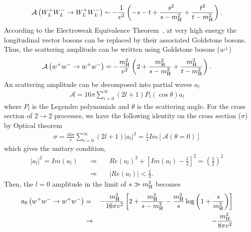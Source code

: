 \begin{eqnarray} 
\label{eq:WWscat}
\mathcal{A}\left( W_L^+W_L^- \to W_L^+W_L^- \right) 
\sim 
- \frac{1}{v^2}  \left( -s - t + \frac{s^2}{s - m_{\mathrm{H}}^2} + \frac{t^2}{t - m_{\mathrm{H}}^2} \right). 
\end{eqnarray} 
According to the Electroweak Equivalence Theorem~\cite{He:1994br},  
at very high energy the longitudinal vector bosons can be replaced by 
their associated Goldstone bosons. Thus, the scattering amplitude can be written 
using Goldstone bosons ($w^\pm$)
\begin{eqnarray} 
\mathcal{A}\left( w^+w^- \to w^+w^- \right) 
= 
- \frac{m_{\mathrm{H}}^2}{v^2}  \left( 2 + \frac{m_{\mathrm{H}}^2}{s - m_{\mathrm{H}}^2} + \frac{m_{\mathrm{H}}^2}{t - m_{\mathrm{H}}^2} \right). 
\end{eqnarray} 
An scattering amplitude can be decomposed into partial waves $a_l$
\begin{eqnarray} 
\mathcal{A} = 16 \pi \sum_{i=0}^\infty 
              \left( 2l+1 \right) P_l \left( \cos \theta \right) a_l
\end{eqnarray} 
where $P_l$ is the Legendre polynomials and $\theta$ is the scattering angle.
For the cross section of $2 \to 2$ processes, we have the 
following identity on the cross section ($\sigma$) by Optical theorem \cite{optical}
\begin{eqnarray} 
\sigma 
= \frac{16 \pi}{s} \sum_{i=0}^\infty  \left( 2l+1 \right) \left| a_l \right|^2 
= \frac{1}{s} Im \left[ \mathcal{A} \left(\theta = 0 \right)  \right]
\end{eqnarray} 
which gives the unitary condition, 
\begin{eqnarray} 
\left| a_l \right|^2 = Im \left( a_l \right) 
\quad &\Rightarrow& \quad  
Re\left( a_l \right)^2 
+ \left[ Im\left( a_l \right)  - \frac{1}{2} \right]^2 
= \left( \frac{1}{2} \right)^2 \\
\label{eq:unitaryWW}
\quad &\Rightarrow& \quad 
\left| Re \left( a_l \right) \right| < \frac{1}{2}.   
\end{eqnarray} 
Then, the $l=0$ amplitude in the limit of $ s \gg m_{\mathrm{H}}^2$ becomes  
\begin{eqnarray} 
a_0\left( w^+w^- \to w^+w^- \right)  
&=&  
- \frac{m_{\mathrm{H}}^2}{16\pi v^2}  
\left[ 2 + \frac{m_{\mathrm{H}}^2}{s - m_{\mathrm{H}}^2} 
       - \frac{m_{\mathrm{H}}^2}{s} \log \left( 1 + \frac{s}{m_{\mathrm{H}}^2} \right) \right]  \\
&\rightarrow&
- \frac{m_{\mathrm{H}}^2}{8\pi v^2} 
\end{eqnarray} 
